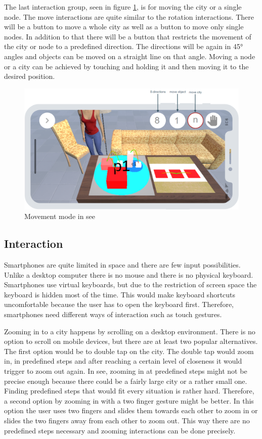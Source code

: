 The last interaction group, seen in figure \ref{fig:move}, is for moving the \gls{city} or a single \gls{node}.
The move interactions are quite similar to the rotation interactions.
There will be a button to move a whole \gls{city} as well as a button to move only single \glspl{node}.
In addition to that there will be a button that restricts the movement of the \gls{city} or node to a predefined direction.
The directions will be again in 45° angles and objects can be moved on a straight line on that angle.
Moving a \gls{node} or a \gls{city} can be achieved by touching and holding it and then moving it to the desired position.
\begin{figure}[htb]
    \centering
    \includegraphics[width=1\textwidth]{Concept/img/menu5.png}
    \caption{Movement mode in \gls{see}}\label{fig:move}
\end{figure}

\subsection{Interaction}

Smartphones are quite limited in space and there are few input possibilities.
Unlike a desktop computer there is no mouse and there is no physical keyboard.
Smartphones use virtual keyboards, but due to the restriction of screen space the keyboard is hidden most of the time.
This would make keyboard shortcuts uncomfortable because the user has to open the keyboard first.
Therefore, smartphones need different ways of interaction such as touch gestures. 

Zooming in to a \gls{city} happens by scrolling on a desktop environment. 
There is no option to scroll on mobile devices, but there are at least two popular alternatives.
The first option would be to double tap on the \gls{city}.
The double tap would zoom in, in predefined steps and after reaching a certain level of closeness it would trigger to zoom out again.
In \gls{see}, zooming in at predefined steps might not be precise enough because there could be a fairly large \gls{city} or a rather small one.
Finding predefined steps that would fit every situation is rather hard.
Therefore, a second option by zooming in with a two finger gesture might be better. 
In this option the user uses two fingers and slides them towards each other to zoom in or slides the two fingers away from each other to zoom out.
This way there are no predefined steps necessary and zooming interactions can be done precisely.

